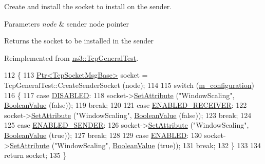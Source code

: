 Create and install the socket to install on the sender. 


\begin{DoxyParams}{Parameters}
{\em node} & sender node pointer \\
\hline
\end{DoxyParams}
\begin{DoxyReturn}{Returns}
the socket to be installed in the sender 
\end{DoxyReturn}


Reimplemented from \hyperlink{classns3_1_1TcpGeneralTest_a0476c37d8a08b42d42f6ea2634eece70}{ns3\+::\+Tcp\+General\+Test}.


\begin{DoxyCode}
112 \{
113   \hyperlink{classns3_1_1Ptr}{Ptr<TcpSocketMsgBase>} socket = TcpGeneralTest::CreateSenderSocket (node);
114 
115   \textcolor{keywordflow}{switch} (\hyperlink{classWScalingTestCase_a72831e1b3b682abc7055beee2e0022c1}{m\_configuration})
116     \{
117     \textcolor{keywordflow}{case} \hyperlink{classWScalingTestCase_a6b31fa8be505eaac47c2383fb17dc5fda38d8cd6b561bf9a66c26f3ed77484267}{DISABLED}:
118       socket->\hyperlink{classns3_1_1ObjectBase_ac60245d3ea4123bbc9b1d391f1f6592f}{SetAttribute} (\textcolor{stringliteral}{"WindowScaling"}, \hyperlink{classns3_1_1BooleanValue}{BooleanValue} (\textcolor{keyword}{false}));
119       \textcolor{keywordflow}{break};
120 
121     \textcolor{keywordflow}{case} \hyperlink{classWScalingTestCase_a6b31fa8be505eaac47c2383fb17dc5fda2019990e4d73c728a156c14570c9feef}{ENABLED\_RECEIVER}:
122       socket->\hyperlink{classns3_1_1ObjectBase_ac60245d3ea4123bbc9b1d391f1f6592f}{SetAttribute} (\textcolor{stringliteral}{"WindowScaling"}, \hyperlink{classns3_1_1BooleanValue}{BooleanValue} (\textcolor{keyword}{false}));
123       \textcolor{keywordflow}{break};
124 
125     \textcolor{keywordflow}{case} \hyperlink{classWScalingTestCase_a6b31fa8be505eaac47c2383fb17dc5fda605d0a930221d4226dfee3e4c89b47a3}{ENABLED\_SENDER}:
126       socket->\hyperlink{classns3_1_1ObjectBase_ac60245d3ea4123bbc9b1d391f1f6592f}{SetAttribute} (\textcolor{stringliteral}{"WindowScaling"}, \hyperlink{classns3_1_1BooleanValue}{BooleanValue} (\textcolor{keyword}{true}));
127       \textcolor{keywordflow}{break};
128 
129     \textcolor{keywordflow}{case} \hyperlink{classWScalingTestCase_a6b31fa8be505eaac47c2383fb17dc5fdae72009ae17f1ed4d86c7c67734348f68}{ENABLED}:
130       socket->\hyperlink{classns3_1_1ObjectBase_ac60245d3ea4123bbc9b1d391f1f6592f}{SetAttribute} (\textcolor{stringliteral}{"WindowScaling"}, \hyperlink{classns3_1_1BooleanValue}{BooleanValue} (\textcolor{keyword}{true}));
131       \textcolor{keywordflow}{break};
132     \}
133 
134   \textcolor{keywordflow}{return} socket;
135 \}
\end{DoxyCode}


